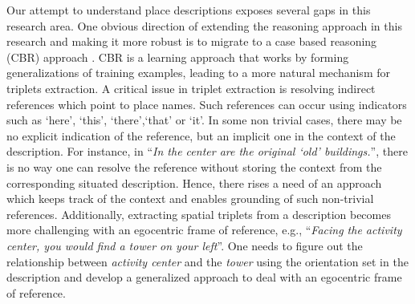 \documentclass[letter]{sig-alternate}
\begin{document}
Our attempt to understand place descriptions exposes several gaps in this research area. One obvious direction of extending the reasoning approach in this research and making it more robust is to migrate to a case based reasoning (CBR) approach \cite{xu:case}. CBR is a learning approach that works by forming generalizations of training examples, leading to a more natural mechanism for triplets extraction. 
A critical issue in triplet extraction is resolving indirect references which point to place names.
Such references can occur using indicators such as `here', `this', `there',`that' or `it'. 
In some non trivial cases, there may be no explicit indication of the reference, but an implicit one in the context of the description. For instance, in ``\textit{In the center are the original `old' buildings.}'', there is no way one can resolve the reference without storing the context from the corresponding situated description. 
Hence, there rises a need of an approach which keeps track of the context and enables grounding of such non-trivial references. 
Additionally, extracting spatial triplets from a description becomes more challenging with an egocentric frame of reference, e.g., ``\textit{Facing the activity center, you would find a tower on your left}''. One needs to figure out the relationship between \textit{activity center} and the \textit{tower} using the orientation set in the description and develop a generalized approach to deal with an egocentric frame of reference.


%
%
\end{document}
